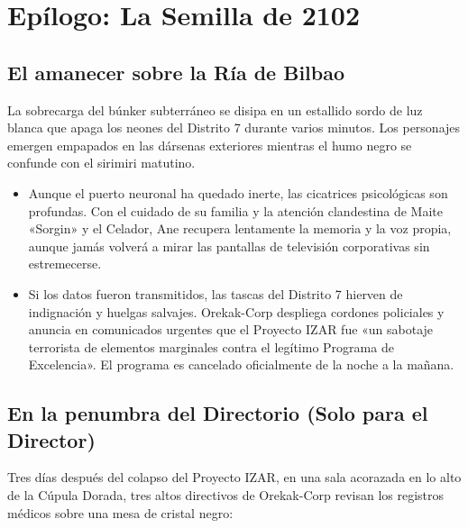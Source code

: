 \chapter{Epílogo: La Semilla de 2102}


\section{El amanecer sobre la Ría de Bilbao}

La sobrecarga del búnker subterráneo se disipa en un estallido sordo de luz blanca que apaga los neones del Distrito 7 durante varios minutos. Los personajes emergen empapados en las dársenas exteriores mientras el humo negro se confunde con el sirimiri matutino.

\begin{itemize}
  \item {} Aunque el puerto neuronal ha quedado inerte, las cicatrices psicológicas son profundas. Con el cuidado de su familia y la atención clandestina de Maite «Sorgin» y el Celador, Ane recupera lentamente la memoria y la voz propia, aunque jamás volverá a mirar las pantallas de televisión corporativas sin estremecerse.
  \item {} Si los datos fueron transmitidos, las tascas del Distrito 7 hierven de indignación y huelgas salvajes. Orekak-Corp despliega cordones policiales y anuncia en comunicados urgentes que el Proyecto IZAR fue «un sabotaje terrorista de elementos marginales contra el legítimo Programa de Excelencia». El programa es cancelado oficialmente de la noche a la mañana.
\end{itemize}

\section{En la penumbra del Directorio (Solo para el Director)}

Tres días después del colapso del Proyecto IZAR, en una sala acorazada en lo alto de la Cúpula Dorada, tres altos directivos de Orekak-Corp revisan los registros médicos sobre una mesa de cristal negro:

